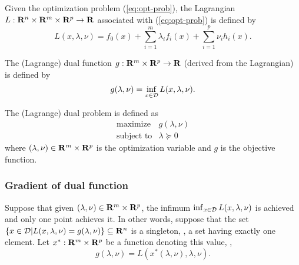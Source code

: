 Given the optimization problem (\ref{eq:opt-prob}),
the Lagrangian $L:\mathbf{R}^n \times \mathbf{R}^m \times \mathbf{R}^p \to \mathbf{R}$
associated with (\ref{eq:opt-prob})
is defined by
\begin{equation}
\label{eq:Lagrangian}
L(x, \lambda, \nu) = f_0(x) + \sum_{i=1}^m \lambda_i f_i(x) + \sum_{i=1}^p \nu_i h_i(x).
\end{equation}

The (Lagrange) dual function $g:\mathbf{R}^m \times \mathbf{R}^p \to \mathbf{R}$ (derived from the Lagrangian) is defined by
\begin{equation}
g(\lambda, \nu) = \inf_{x\in\mathcal{D}} L(x, \lambda, \nu).
\end{equation}

The (Lagrange) dual problem is defined as
\begin{equation}
\label{eq:dual-prob}
\begin{array}{ll}
\mbox{maximize} & g(\lambda, \nu)
\\
\mbox{subject to} & \lambda \succeq 0 
\end{array}
\end{equation}
where
$(\lambda, \nu) \in\mathbf{R}^m \times \mathbf{R}^p$ is the optimization variable
and
$g$ is the objective function.

\subsubsection{Gradient of dual function}


Suppose that given $(\lambda, \nu) \in\mathbf{R}^m \times \mathbf{R}^p$,
the infimum $\inf_{x\in\mathcal{D}} L(x,\lambda,\nu)$ is achieved
and only one point achieves it.
In other words,
suppose that the set $\{x\in\mathcal{D}| L(x,\lambda, \nu) = g(\lambda, \nu) \} \subseteq \mathbf{R}^n$ is a singleton,
\ie, a set having exactly one element.
Let $x^\ast: \mathbf{R}^m \times \mathbf{R}^p$
be a function denoting this value,
\ie,
\begin{equation}
g(\lambda, \nu) = L(x^\ast(\lambda, \nu), \lambda, \nu).
\end{equation}

